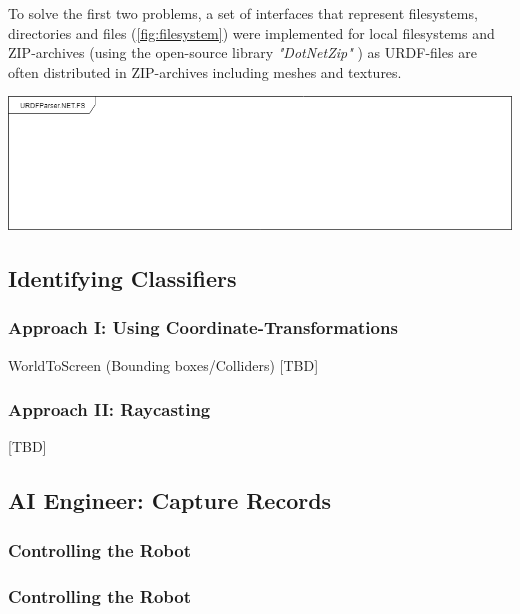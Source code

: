 To solve the first two problems, a set of interfaces that represent filesystems, directories and files (\ref{fig:filesystem}) were implemented for local filesystems and ZIP-archives (using the open-source library \textit{"DotNetZip"} \cite{DotNetZip}) as URDF-files are often distributed in ZIP-archives including meshes and textures.

\begin{center}
\noindent\includegraphics[width=14cm]{tex/img/ch05/URDFParser_FileSystemInterfaces02.png}
\label{fig:filesystem}
\end{center}

\subsection{Identifying Classifiers}
\subsubsection{Approach I: Using Coordinate-Transformations}
WorldToScreen (Bounding boxes/Colliders) [TBD]

\subsubsection{Approach II: Raycasting}
[TBD]

\subsection{AI Engineer: Capture Records}
\subsubsection{Controlling the Robot}

\subsubsection{Controlling the Robot}

